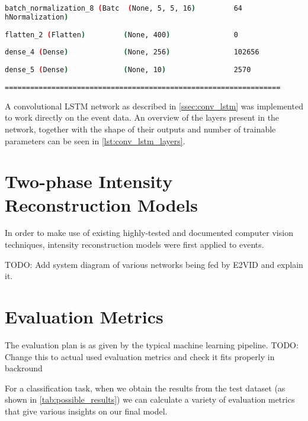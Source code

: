 \begin{lstlisting}[language=Bash,caption={Overview of layers in Convolutional LTSM network},label={lst:conv_lstm_layers},numbers=none]
batch_normalization_8 (Batc  (None, 5, 5, 16)         64        
hNormalization)                                                 
                                                                
flatten_2 (Flatten)         (None, 400)               0         
                                                                
dense_4 (Dense)             (None, 256)               102656    
                                                                
dense_5 (Dense)             (None, 10)                2570      
                                                                
=================================================================
\end{lstlisting}

A convolutional LSTM network as described in \cref{ssec:conv_lstm} was implemented to work directly on the event data. An overview of the layers present in the network, together with the shape of their outputs and number of trainable parameters can be seen in \cref{lst:conv_lstm_layers}.

\section{Two-phase Intensity Reconstruction Models}

In order to make use of existing highly-tested and documented computer vision techniques, intensity reconstruction models were first applied to events.

\color{red} TODO: Add system diagram of various networks being fed by E2VID and explain it. \color{black}

\section{Evaluation Metrics} \label{sec:evalutaion_metrics}

The evaluation plan is as given by the typical machine learning pipeline\cite{IntroToML}. \color{red} TODO: Change this to actual used evaluation metrics and check it fits properly in backround \color{black}

For a classification task, when we obtain the results from the test dataset (as shown in \cref{tab:possible_results}) we can calculate a variety of evaluation metrics that give various insights on our final model.

